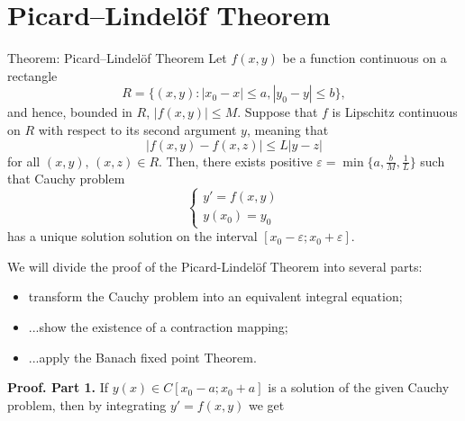 \documentclass[10pt]{beamer}
\begin{document}
\section{Picard–Lindelöf Theorem}
\begin{frame}
  \begin{block}{Theorem: Picard–Lindelöf Theorem}
    Let \(f(x,y)\) be a function continuous on a rectangle
    \[R=\{(x,y):|x_0 - x| \le a, |y_0 - y| \le b\},\]
    and hence, bounded in \(R\), \(|f(x,y)| \le M\).
    Suppose that \(f\) is Lipschitz continuous on \(R\) with respect to its second
    argument \(y\), meaning that
    \[|f(x, y) - f(x, z)| \le L|y - z|\]
    for all \((x, y), \, (x, z) \in R\).
    Then, there exists positive \(\varepsilon = \min{\{a, \frac{b}{M}, \frac{1}{L}\}}\) such that
    Cauchy problem
    \[\begin{cases}y' = f(x,y) \\ y(x_0) = y_0 \end{cases}\]
    has a unique solution solution on the interval
    \([x_0 - \varepsilon; x_0 + \varepsilon]\).
  \end{block}
\end{frame}

\begin{frame}
  We will divide the proof of the Picard-Lindelöf Theorem into several parts:
  \begin{itemize}
    \item transform the Cauchy problem into an equivalent integral equation;
    \item ...show the existence of a contraction mapping;
    \item ...apply the Banach fixed point Theorem.
  \end{itemize}
\end{frame}

\begin{frame}
  \textbf{Proof. Part 1.} If \(y(x) \in C[x_0 - a;x_0 + a]\) is a solution of the given
  Cauchy problem, then by integrating \(y' = f(x, y)\) we get
\end{frame}
\end{document}
